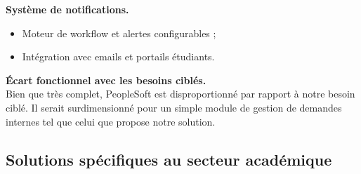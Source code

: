 \begin{enumerate}[label=\alph*)]
\textbf{Système de notifications.}
\begin{itemize}
\item Moteur de workflow et alertes configurables ;
\item Intégration avec emails et portails étudiants.
\end{itemize}

\textbf{Écart fonctionnel avec les besoins ciblés.} \\
Bien que très complet, PeopleSoft est disproportionné par rapport à notre besoin ciblé. Il serait surdimensionné pour un simple module de gestion de demandes internes tel que celui que propose notre solution.

\end{enumerate}

\subsection{Solutions spécifiques au secteur académique}
